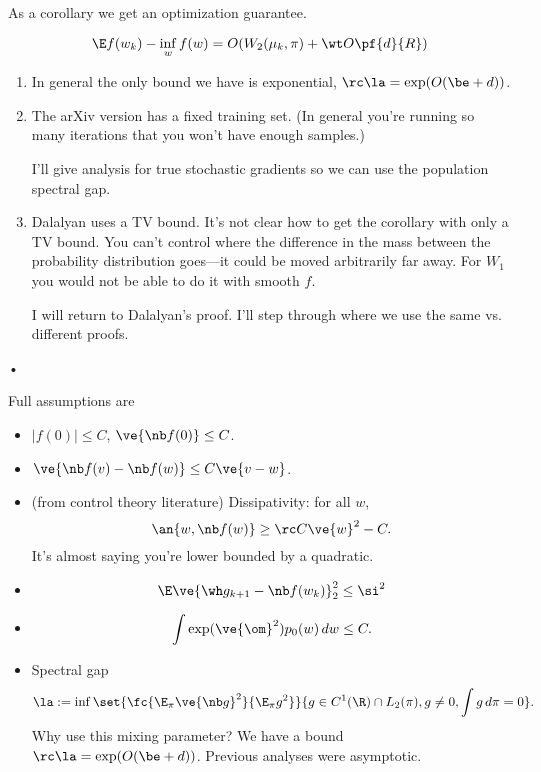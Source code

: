 As a corollary we get an optimization guarantee.
\begin{cor}
$$
\E f(w_k) - \inf_w f(w) = O(W_2(\mu_k, \pi) + \wt O\pf{d}{R})%
$$
\end{cor}
\begin{rem}
\begin{enumerate}
\item
In general the only bound we have is exponential, $\rc\la = \exp(O(\be + d))$. 
\item
The arXiv version has a fixed training set. 
(In general you're running so many iterations that you won't have enough samples.)

I'll give analysis for true stochastic gradients so we can use the population spectral gap.
\item
Dalalyan uses a TV bound. It's not clear how to get the corollary with only a TV bound. You can't control where the difference in the mass between the probability distribution goes---it could be moved arbitrarily far away.
For $W_1$ you would not be able to do it with smooth $f$.

I will return to Dalalyan's proof. I'll step through where we use the same vs. different proofs.
\end{enumerate}•
\end{rem}
Full assumptions are
\begin{itemize}
\item
$|f(0)|\le C$, $\ve{\nb f(0)}\le C$.
\item
$\ve{\nb f(v)-\nb f(w)}\le C\ve{v-w}$.
\item
(from control theory literature)
Dissipativity: for all $w$, 
$$
\an{w,\nb f(w)} \ge \rc C\ve{w}^2 - C.
$$
It's almost saying you're lower bounded by a quadratic.
\item
$$
\E \ve{\wh g_{k+1} - \nb f(w_k)}_2^2 \le \si^2
$$
\item
$$
\int \exp(\ve{\om}^2) p_0(w)\,dw\le C.
$$
\item
Spectral gap
$$
\la :=\inf\set{\fc{\E_\pi \ve{\nb g}^2}{\E_\pi g^2}}{g\in C^1(\R) \cap L_2(\pi), g\ne 0, \int g\,d\pi=0}.
$$
Why use this mixing parameter? We have a bound $\rc \la = \exp(O(\be + d))$. Previous analyses were asymptotic.
\end{itemize}

